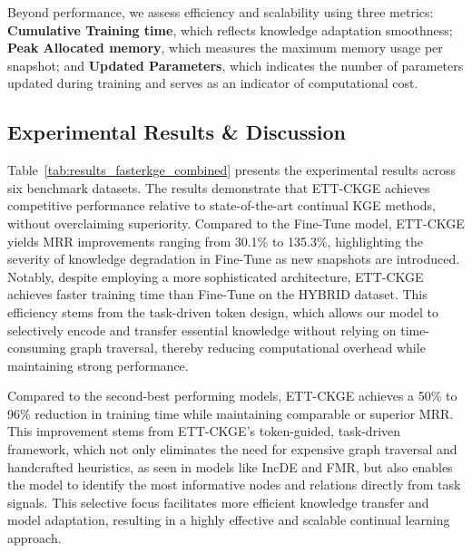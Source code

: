 \documentclass[runningheads]{llncs}
\begin{document}
Beyond performance, we assess efficiency and scalability using three metrics: \textbf{Cumulative Training time}, which reflects knowledge adaptation smoothness; \textbf{Peak Allocated memory}, which measures the maximum memory usage per snapshot; and \textbf{Updated Parameters}, which indicates the number of parameters updated during training and serves as an indicator of computational cost.


\subsection{Experimental Results \& Discussion}


Table~\ref{tab:results_fasterkge_combined} presents the experimental results across six benchmark datasets. The results demonstrate that ETT-CKGE achieves competitive performance relative to state-of-the-art continual KGE methods, without overclaiming superiority. Compared to the Fine-Tune model, ETT-CKGE yields MRR improvements ranging from 30.1\% to 135.3\%, highlighting the severity of knowledge degradation in Fine-Tune as new snapshots are introduced. Notably, despite employing a more sophisticated architecture, ETT-CKGE achieves faster training time than Fine-Tune on the HYBRID dataset. This efficiency stems from the task-driven token design, which allows our model to selectively encode and transfer essential knowledge without relying on time-consuming graph traversal, thereby reducing computational overhead while maintaining strong performance. 
  

Compared to the second-best performing models, ETT-CKGE achieves a 50\% to 96\% reduction in training time while maintaining comparable or superior MRR. This improvement stems from ETT-CKGE’s token-guided, task-driven framework, which not only eliminates the need for expensive graph traversal and handcrafted heuristics, as seen in models like IncDE and FMR, but also enables the model to identify the most informative nodes and relations directly from task signals. This selective focus facilitates more efficient knowledge transfer and model adaptation, resulting in a highly effective and scalable continual learning approach.
\end{document}
